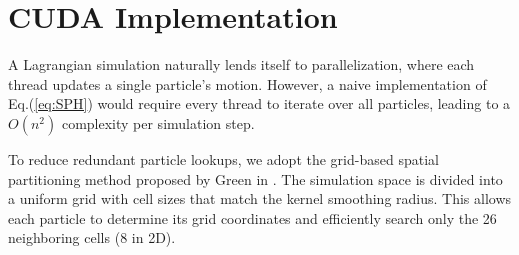 \section{CUDA Implementation}

A Lagrangian simulation naturally lends itself to parallelization, where each thread updates a single particle’s motion. However, a naive implementation of Eq.(\ref{eq:SPH}) would require every thread to iterate over all particles, leading to a $O(n^2)$ complexity per simulation step.

To reduce redundant particle lookups, we adopt the grid-based spatial partitioning method proposed by Green in \cite{green2010particle}. The simulation space is divided into a uniform grid with cell sizes that match the kernel smoothing radius. This allows each particle to determine its grid coordinates and efficiently search only the 26 neighboring cells (8 in 2D).

